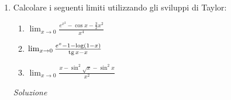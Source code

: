 \documentclass{article}
\begin{document}
\begin{enumerate}[label=\textbf{Esercizio 
    8.\arabic*.},itemindent=*]
\begin{enumerate}
        Da cui
        \[\log x=\log 2+\left( \frac{x}{2}-1 \right)+\frac{1}{2}\left( \frac{x}{2}-1 \right)^2+\frac{1}{3}\left( \frac{x}{2}-1 \right)^3+o\left(\left( \frac{x}{2}-1 \right)^3\right)\]
        \item Poniamo $t=\tg x$ e $y=\arctg(x)$. In un intorno di $0$, sia $\tg x$ che $\arctg x$ tendono a 0, quindi anche $t$ e $y$. Utilizzando gli sviluppi fondamentali
        \[\sen t+\log(1+ y)=\left[ t-\frac{t^3}{6} +o(t^3)\right]+\left[ y-\frac{y^2}{2} +\frac{y^3}{3}+o(y^3)\right]\]
        Adesso sviluppiamo anche $t$ e $y$:
        \[t=\tg x= x+\frac{x^3}{3}+o(x^3)~~~~~~y=\arctg x=x-\frac{x^3}{3}+o(x^3)\]
        Di conseguenza 
        \[\begin{align*}
            &\sen (\tg x)+\log(1+\arctg x)=\\&=\left[ \left( x+\frac{x^3}{3}+o(x^3) \right)-\frac{\left( x+\frac{x^3}{3}+o(x^3) \right)^3}{6} +o\left(\left( x+\frac{x^3}{3}+o(x^3) \right)^3\right)\right]+\\&+\left[ \left( x-\frac{x^3}{3}+o(x^3) \right)-\frac{\left( x-\frac{x^3}{3}+o(x^3) \right)^2}{2} +\frac{\left( x-\frac{x^3}{3}+o(x^3) \right)^3}{3}+o\left(\left( x-\frac{x^3}{3}+o(x^3) \right)^3\right)\right]=\\&=2x+\frac{x^3}{3}-\frac{1}{2}x^2+o(x^3)
        \end{align*}\]
    \end{enumerate}
\item Calcolare i seguenti limiti utilizzando gli sviluppi di Taylor:
    \begin{enumerate}
        \item $\lim_{x\to 0}\frac{e^{x^2}-\cos x-\frac{3}{2}x^2}{x^4}$
        \item $\lim_{x\to 0}\frac{e^x-1-\log(1-x)}{\operatorname{tg} x-x}$
        \item $\lim_{x\to 0}\frac{x-\sin^2 \sqrt{x}-\sin^2x}{x^2}$
    \end{enumerate}
    \item[\textit{\large Soluzione~}]~
\end{enumerate}
\end{document}
